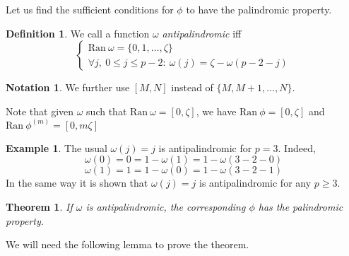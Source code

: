 \documentclass[a4paper]{article}
\theoremstyle{plain}
\newtheorem{theorem}{Theorem}[section]
\theoremstyle{definition}
\newtheorem{definition}{Definition}
\newtheorem*{notation}{Notation}
\newtheorem*{example}{Example}
\begin{document}
    Let us find the sufficient conditions for $\phi$ to have the palindromic property.
    
\begin{definition}
We call a function $\omega$  \textit{antipalindromic} iff
\[\begin{cases}
	\mathrm{Ran }\ \omega = \{0,1, \ldots, \zeta\} \\
	\forall j,\ 0 \le j \le p-2: \  \omega(j) = \zeta - \omega(p-2-j)
\end{cases}\]
\end{definition}

\begin{notation}
We further use $[M, N]$ instead of $\{M,M+1, \ldots, N\}$.
\end{notation}

Note that given $\omega$ such that $\mathrm{Ran}\ \omega = [0,\zeta]$, we have $\mathrm{Ran}\ \phi = [0,\zeta]$ and $\mathrm{Ran}\ \phi^{(m)} = [0,m\zeta]$

\begin{example}
The usual $\omega(j)=j$ is antipalindromic for $p = 3$. Indeed,
$$
\omega(0) = 0 = 1 - \omega(1) = 1 - \omega(3 - 2 - 0)
$$
$$
\omega(1) = 1 = 1 - \omega(0) = 1 - \omega(3 - 2 - 1)
$$
In the same way it is shown that $\omega(j)=j$ is antipalindromic for any $p \ge 3$.
\end{example}

\begin{theorem}
If $\omega$ is antipalindromic, the corresponding $\phi$ has the palindromic property.
\end{theorem}

We will need the following lemma to prove the theorem.
\end{document}
